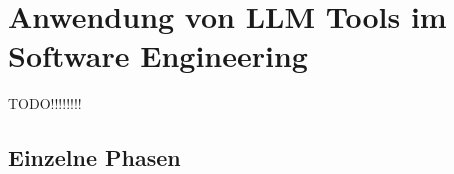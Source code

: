 
\chapter{Anwendung von LLM Tools im Software Engineering} 

TODO!!!!!!!!

\section{Einzelne Phasen}  \label{Einzelne Phasen}